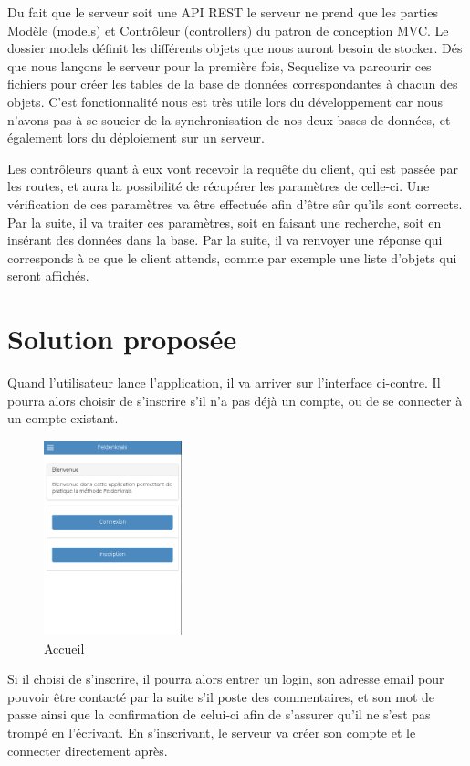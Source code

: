 \documentclass[pidr]{tnreport}
\begin{document}
Du fait que le serveur soit une API REST le serveur ne prend que les parties Modèle (models) et Contrôleur (controllers) du patron de conception MVC. Le dossier models définit les différents objets que nous auront besoin de stocker. Dés que nous lançons le serveur pour la première fois, Sequelize va parcourir ces fichiers pour créer les tables de la base de données correspondantes à chacun des objets. C’est fonctionnalité nous est très utile lors du développement car nous n’avons pas à se soucier de la synchronisation de nos deux bases de données, et également lors du déploiement sur un serveur.

Les contrôleurs quant à eux vont recevoir la requête du client, qui est passée par les routes, et aura la possibilité de récupérer les paramètres de celle-ci. Une vérification de ces paramètres va être effectuée afin d’être sûr qu’ils sont corrects. Par la suite, il va traiter ces paramètres, soit en faisant une recherche, soit en insérant des données dans la base. Par la suite, il va renvoyer une réponse qui corresponds à ce que le client attends, comme par exemple une liste d’objets qui seront affichés.

\chapter{Solution proposée}
Quand l'utilisateur lance l'application, il va arriver sur l'interface ci-contre. Il pourra alors choisir de s'inscrire s'il n'a pas déjà un compte, ou de se connecter à un compte existant.

\begin{figure}[h]
  \centering
  \includegraphics[width=4cm]{figures/accueil}
  \caption{Accueil}
  \label{fig:accueil}
\end{figure}
Si il choisi de s'inscrire, il pourra alors entrer un login, son adresse email pour pouvoir être contacté par la suite s'il poste des commentaires, et son mot de passe ainsi que la confirmation de celui-ci afin de s'assurer qu'il ne s'est pas trompé en l'écrivant. En s'inscrivant, le serveur va créer son compte et le connecter directement après.
\end{document}
